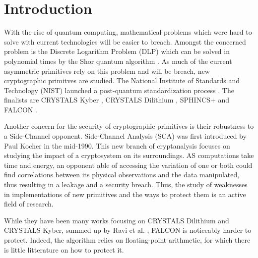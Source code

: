 \documentclass[runningheads]{llncs}
\begin{document}
\section{Introduction}
With the rise of quantum computing, mathematical problems which were hard to solve with current technologies will be easier to breach. Amongst the concerned problem is the Discrete Logarithm Problem (DLP) which can be solved in polynomial times by the Shor quantum algorithm \cite{doi:10.1137/S0036144598347011}. As much of the current asymmetric primitives rely on this problem and will be breach, new cryptographic primitves are studied. The National Institute of Standards and Technology (NIST) launched a post-quantum standardization process \cite{chen2016report}. The finalists are CRYSTALS Kyber \cite{8406610,nistfips203mlkem}, CRYSTALS Dilithium \cite{Ducas_Kiltz_Lepoint_Lyubashevsky_Schwabe_Seiler_Stehlé_2018,nistfips204mldsa}, SPHINCS+ \cite{10.1145/3319535.3363229,nistfips205shdsa} and FALCON \cite{prest2020falcon}.

\medskip

\noindent Another concern for the security of cryptographic primitives is their robustness to a Side-Channel opponent. Side-Channel Analysis (SCA) was first introduced by Paul Kocher \cite{10.1007/3-540-68697-5_9} in the mid-1990. This new branch of cryptanalysis focuses on studying the impact of a cryptosystem on its surroundings. AS computations take time and energy, an opponent able of accessing the variation of one or both could find correlations between its physical observations and the data manipulated, thus resulting in a leakage and a security breach. Thus, the study of weaknesses in implementations of new primitives and the ways to protect them is an active field of research.

\medskip 

\noindent While they have been many works focusing on CRYSTALS Dilithium and CRYSTALS Kyber, summed up by Ravi et al. \cite{10.1145/3603170}, FALCON is noticeably harder to protect. Indeed, the algorithm relies on floating-point arithmetic, for which there is little litterature on how to protect it.
%
\end{document}
